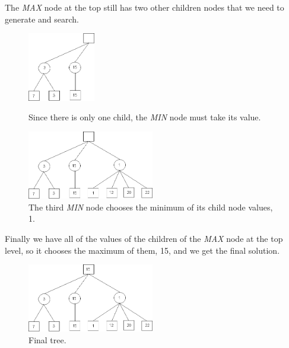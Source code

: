 The \textit{MAX} node at the top still has two other children nodes that we need to generate and search.

\begin{figure}[H]
\centering
	\begin{minipage}[b]{0.45\linewidth}
		\centering
		\includegraphics[height=3cm]{2_State_of_the_art/Arimaa_on_MCTS_Benoit/img/Minimax6.png}
		\caption{\label{fig:Minimax6}Since there is only one child, the \textit{MIN} node must take its value.}
		\end{minipage}%
	\hspace*{1cm}
	\begin{minipage}[b]{0.45\linewidth}
		\centering
		\includegraphics[height=3cm]{2_State_of_the_art/Arimaa_on_MCTS_Benoit/img/Minimax8.png}
		\caption{\label{fig:Minimax8}The third \textit{MIN} node chooses the minimum of its child node values, 1.}
	\end{minipage}%
\end{figure}

Finally we have all of the values of the children of the  \textit{MAX} node at the top level, so it chooses the maximum of them, 15, and we get the final solution. 

\begin{figure}[H]
\centering
	\begin{minipage}[b]{1\linewidth}
		\centering
		\includegraphics[height=3cm]{2_State_of_the_art/Arimaa_on_MCTS_Benoit/img/Minimax9.png}
		\caption{\label{fig:Minimax9}Final tree.}
	\end{minipage}%
\end{figure}


